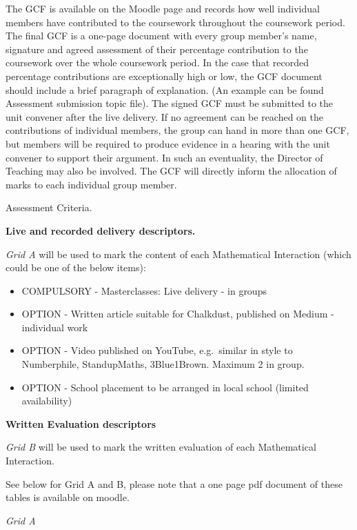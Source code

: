 \documentclass[
]{book}
\providecommand{\tightlist}{%
  \setlength{\itemsep}{0pt}\setlength{\parskip}{0pt}}
\begin{document}
The GCF is available on the Moodle page and records how well individual members have contributed to the coursework throughout the coursework period. The final GCF is a one-page document with every group member's name, signature and agreed assessment of their percentage contribution to the coursework over the whole coursework period. In the case that recorded percentage contributions are exceptionally high or low, the GCF document should include a brief paragraph of explanation. (An example can be found Assessment submission topic file). The signed GCF must be submitted to the unit convener after the live delivery. If no agreement can be reached on the contributions of individual members, the group can hand in more than one GCF, but members will be required to produce evidence in a hearing with the unit convener to support their argument. In such an eventuality, the Director of Teaching may also be involved. The GCF will directly inform the allocation of marks to each individual group member.

Assessment Criteria.

\textbf{Live and recorded delivery descriptors.}

\emph{Grid A} will be used to mark the content of each Mathematical Interaction (which could be one of the below items):

\begin{itemize}
\tightlist
\item
  COMPULSORY - Masterclasses: Live delivery - in groups
  \(~\)
\item
  OPTION - Written article
  suitable for Chalkdust, published on Medium - individual work
\item
  OPTION - Video
  published on YouTube, e.g.~similar in style to Numberphile, StandupMaths, 3Blue1Brown. Maximum 2 in group.
\item
  OPTION - School placement
  to be arranged in local school (limited availability)
\end{itemize}

\textbf{Written Evaluation descriptors}

\emph{Grid B} will be used to mark the written evaluation of each Mathematical Interaction.

See below for Grid A and B, please note that a one page pdf document of these tables is available on moodle.

\emph{Grid A}
\end{document}
